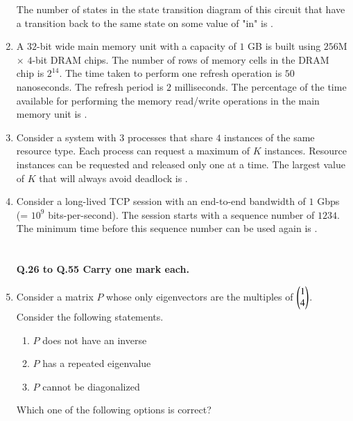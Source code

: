 \documentclass[journal,12pt,onecolumn]{IEEEtran}
\theoremstyle{remark}
\begin{document}
\begin{enumerate}
	The number of states in the state transition diagram of this circuit that have a transition back to the same state on some value of "in" is \underline{\hspace{2cm}}.
	
	\hfill{}
	
	\item A $32$-bit wide main memory unit with a capacity of $1$ GB is built using $256$M $\times$ $4$-bit DRAM chips. The number of rows of memory cells in the DRAM chip is $2^{14}$. The time taken to perform one refresh operation is $50$ nanoseconds. The refresh period is $2$ milliseconds. The percentage  of the time available for performing the memory read/write operations in the main memory unit is \underline{\hspace{2cm}}.
	
	\hfill{}
	
	\item Consider a system with $3$ processes that share $4$ instances of the same resource type. Each process can request a maximum of $K$ instances. Resource instances can be requested and released only one at a time. The largest value of $K$ that will always avoid deadlock is \underline{\hspace{2cm}}.
	
	\hfill{}
	\item Consider a long-lived TCP session with an end-to-end bandwidth of $1$ Gbps (= $10^9$ bits-per-second). The session starts with a sequence number of $1234$. The minimum time  before this sequence number can be used again is \underline{\hspace{2cm}}.\\
	\hfill{}\\
	\\
	\textbf{\large Q.26 to Q.55 Carry one mark each.}
	\item Consider a matrix $P$ whose only eigenvectors are the multiples of $\begin{pmatrix}1 \\ 4\end{pmatrix}$.
	Consider the following statements.
	\begin{enumerate}
		\item[\brak{\text{I}}] $P$ does not have an inverse
		\item[\brak{\text{II}}] $P$ has a repeated eigenvalue
		\item[\brak{\text{III}}] $P$ cannot be diagonalized
	\end{enumerate}
	Which one of the following options is correct?
	

\end{enumerate}
\end{document}
